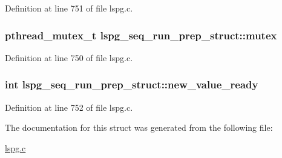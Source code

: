 Definition at line 751 of file lspg.\-c.

\hypertarget{structlspg__seq__run__prep__struct_ad146cb91b5f7dd8bb283092c28781fe7}{
\subsubsection[{mutex}]{\setlength{\rightskip}{0pt plus 5cm}pthread\-\_\-mutex\-\_\-t lspg\-\_\-seq\-\_\-run\-\_\-prep\-\_\-struct\-::mutex}}\label{structlspg__seq__run__prep__struct_ad146cb91b5f7dd8bb283092c28781fe7}


Definition at line 750 of file lspg.\-c.

\hypertarget{structlspg__seq__run__prep__struct_a42d08888327e9059ddd69ddfec31b8a9}{
\subsubsection[{new\-\_\-value\-\_\-ready}]{\setlength{\rightskip}{0pt plus 5cm}int lspg\-\_\-seq\-\_\-run\-\_\-prep\-\_\-struct\-::new\-\_\-value\-\_\-ready}}\label{structlspg__seq__run__prep__struct_a42d08888327e9059ddd69ddfec31b8a9}


Definition at line 752 of file lspg.\-c.



The documentation for this struct was generated from the following file\-:\begin{DoxyCompactItemize}
\item 
\hyperlink{lspg_8c}{lspg.\-c}\end{DoxyCompactItemize}
